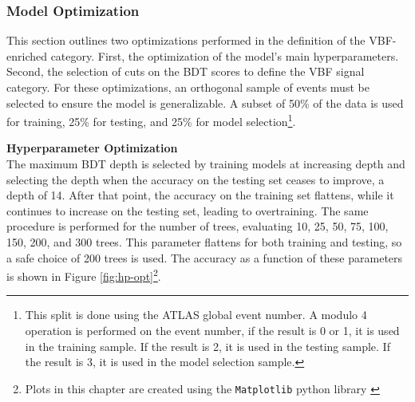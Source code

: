 \subsubsection{Model Optimization}

This section outlines two optimizations performed in the definition of the VBF-enriched category. First, the optimization of the model's main hyperparameters. Second, the selection of cuts on the \gls{BDT} scores to define the \gls{VBF} signal category. For these optimizations, an orthogonal sample of events must be selected to ensure the model is generalizable. A subset of 50\% of the data is used for training, 25\% for testing, and 25\% for model selection\footnote{This split is done using the ATLAS global event number. A modulo 4 operation is performed on the event number, if the result is 0 or 1, it is used in the training sample. If the result is 2, it is used in the testing sample. If the result is 3, it is used in the model selection sample.}.

\noindent\textbf{Hyperparameter Optimization}\\
\indent The maximum \gls{BDT} depth is selected by training models at increasing depth and selecting the depth when the accuracy on the testing set ceases to improve, a depth of 14. After that point, the accuracy on the training set flattens, while it continues to increase on the testing set, leading to overtraining. The same procedure is performed for the number of trees, evaluating 10, 25, 50, 75, 100, 150, 200, and 300 trees. This parameter flattens for both training and testing, so a safe choice of 200 trees is used. The accuracy as a function of these parameters is shown in Figure \ref{fig:hp-opt}\footnote{Plots in this chapter are created using the \texttt{Matplotlib} python library \cite{matplotlib}}.

